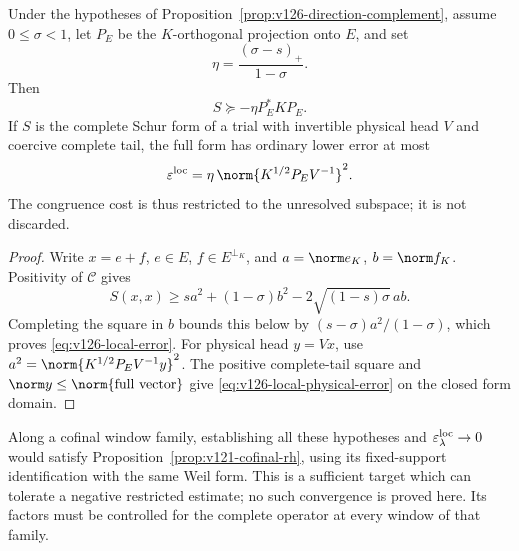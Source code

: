 \begin{corollary}
\label{cor:v126-local-error}
Under the hypotheses of Proposition~\ref{prop:v126-direction-complement},
assume $0\le\sigma<1$, let $P_E$ be the $K$-orthogonal projection
onto $E$, and set
\[
 \eta=\frac{(\sigma-s)_+}{1-\sigma}.
\]
Then
\begin{equation}\label{eq:v126-local-error}
 S\succeq-\eta P_E^*KP_E.
\end{equation}
If $S$ is the complete Schur form of a trial with invertible
physical head $V$ and coercive complete tail, the full form has
ordinary lower error at most
\begin{equation}\label{eq:v126-local-physical-error}
 \varepsilon^{\rm loc}
 =\eta\,\norm{K^{1/2}P_EV^{-1}}^2.
\end{equation}
The congruence cost is thus restricted to the unresolved subspace;
it is not discarded.
\end{corollary}
\begin{proof}
Write $x=e+f$, $e\in E$, $f\in E^{\perp_K}$, and
$a=\norm e_K$, $b=\norm f_K$. Positivity of $\mathcal C$ gives
\[
 S(x,x)\ge sa^2+(1-\sigma)b^2
                 -2\sqrt{(1-s)\sigma}\,ab.
\]
Completing the square in $b$ bounds this below by
$(s-\sigma)a^2/(1-\sigma)$, which proves
\eqref{eq:v126-local-error}. For physical head $y=Vx$, use
$a^2=\norm{K^{1/2}P_EV^{-1}y}^2$. The positive complete-tail
square and $\norm y\le\norm{\text{full vector}}$ give
\eqref{eq:v126-local-physical-error} on the closed form domain.
\end{proof}

Along a cofinal window family, establishing all these hypotheses
and $\varepsilon^{\rm loc}_\lambda\to0$ would satisfy
Proposition~\ref{prop:v121-cofinal-rh}, using its fixed-support
identification with the same Weil form. This is a sufficient target
which can tolerate a negative restricted estimate; no such
convergence is proved here. Its factors must be controlled for
the complete operator at every window of that family.

